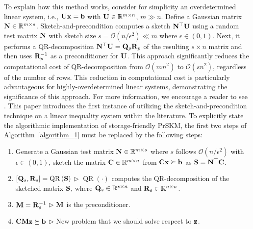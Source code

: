 \documentclass[12pt,draftcls,onecolumn]{IEEEtran}
\begin{document}
To explain how this method works, consider for simplicity an overdetermined linear system, i.e., $\mathbf{U}\mathbf{x}=\mathbf{b}$ with $\mathbf{U}\in\mathbb{R}^{m\times n}$, $m\gg n$. 
Define a Gaussian matrix $\mathbf{N}\in \mathbb{R}^{m\times s}$. Sketch-and-precondition computes a sketch $\mathbf{N}^{\top}\mathbf{U}$ using a random test matrix $\mathbf{N}$ with sketch size $s=\mathcal{O}\left(n/\epsilon^{2}\right)\ll m$ where $\epsilon\in (0,1)$. Next, it performs a QR-decomposition $\mathbf{N}^{\top}\mathbf{U}=\mathbf{Q}_p\mathbf{R}_p$ of the resulting $s\times n$ matrix and then uses $\mathbf{R}_{p}^{-1}$ as a preconditioner for $\mathbf{U}$. This approach significantly reduces the computational cost of QR-decomposition from $\mathcal{O}\left(mn^2\right)$ to $\mathcal{O}\left(sn^2\right)$, regardless of the number of rows. This reduction in computational cost is particularly advantageous for highly-overdetermined linear systems, demonstrating the significance of this approach. For more information, we encourage a reader to see
\cite{martinsson2020randomized,woodruff2014sketching}. This paper introduces the first instance of utilizing the sketch-and-precondition technique on a linear inequality system within the literature. 
To explicitly state the algorithmic implementation of storage-friendly PrSKM, the first two steps of Algorithm~\ref{algorithm_1} must be replaced by the following steps:
\begin{enumerate}
    \item Generate a Gaussian test matrix $\mathbf{N}\in\mathbb{R}^{m\times s}$ where $s$ follows $\mathcal{O}\left(n/\epsilon^{2}\right)$ with $\epsilon\in(0,1)$, sketch the matrix $\mathbf{C}\in\mathbb{R}^{m\times n}$ from $\mathbf{C}\mathbf{x}\succeq\mathbf{b}$ as $\mathbf{S}=\mathbf{N}^{\top}\mathbf{C}$.
    \item $\left[\mathbf{Q}_s,\mathbf{R}_s\right]=\operatorname{QR}\left(\mathbf{S}\right)$ $\triangleright$ $\operatorname{QR}(\cdot)$ computes the QR-decomposition of the sketched matrix $\mathbf{S}$, where $\mathbf{Q}_s\in \mathbb{R}^{s\times n}$ and $\mathbf{R}_{s}\in\mathbb{R}^{n\times n}$.
    \item $\mathbf{M}=\mathbf{R}^{-1}_{s}$ $\triangleright$ $\mathbf{M}$ is the preconditioner.
    \item $\mathbf{C} \mathbf{M} \mathbf{z}\succeq\mathbf{b}$ $\triangleright$ New problem that we should solve respect to $\mathbf{z}$.
\end{enumerate}
\end{document}
